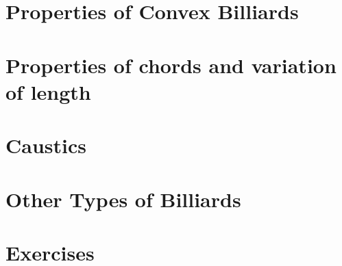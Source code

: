\section{Properties of Convex Billiards}
\label{app:appC-convex-billiard}
 

 \section[Properties of chords]{Properties of   chords and variation of length}
\label{sec:appC-cordas-causticas}
  
 
 
 \section{Caustics}
 \label{sec:appC-causticas}
  
 
 
\section{Other Types of Billiards}
\label{sec:appC-other-billiards}


\section{Exercises}
\label{sec:appC-exercises}
